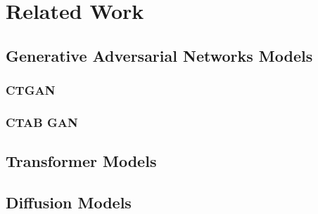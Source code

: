 \chapter{Related Work}
\label{ch:relatedWork}
\section{Generative Adversarial Networks Models}
\label{ch:relatedWork-generativeAdversarialNetworksModels}

\subsection{CTGAN}
\label{ch:relatedWork-generativeAdversarialNetworksModels-ctgan}

\subsection{CTAB GAN}
\label{ch:relatedWork-generativeAdversarialNetworksModels-ctabGAN}
\section{Transformer Models}
\label{ch:relatedWork-transformers}
\section{Diffusion Models}
\label{ch:relatedWork-diffusionModels}



